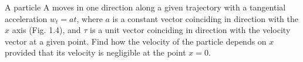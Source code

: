 
\item A particle A moves in one direction along a given trajectory with a tangential acceleration \( w_t = at \), where \( a \) is a constant vector coinciding in direction with the \( x \) axis (Fig. 1.4), and \( \tau \) is a unit vector coinciding in direction with the velocity vector at a given point. Find how the velocity of the particle depends on \( x \) provided that its velocity is negligible at the point \( x = 0 \).
